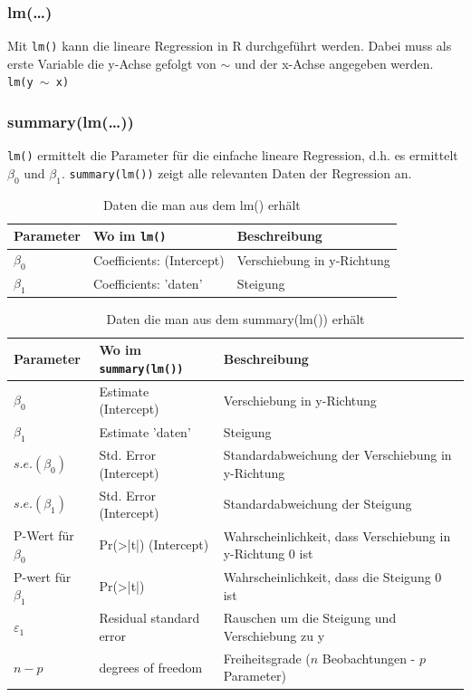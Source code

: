\subsubsection{lm(\ldots)}
Mit \verb!lm()! kann die lineare Regression in R durchgeführt  werden. Dabei 
muss als erste Variable die y-Achse gefolgt von $\sim$ und der x-Achse angegeben 
werden. \\
\verb!lm(y !$\sim$\verb! x)!

\subsubsection{summary(lm(\dots))}
\verb!lm()! ermittelt die Parameter für die einfache lineare Regression, d.h.
es ermittelt $\beta_0$ und $\beta_1$.
\verb!summary(lm())! zeigt alle relevanten Daten der Regression an.
\begin{table}[h!]
	\centering
	\begin{tabular}{l|l|l}
	Parameter & Wo im \verb!lm()! & Beschreibung\\
	\hline
	$\beta_0$ & Coefficients: (Intercept) & Verschiebung in y-Richtung \\
	$\beta_1$ & Coefficients: 'daten' & Steigung \\
	\end{tabular}
	\caption{Daten die man aus dem lm() erhält}
\end{table}

\begin{table}[h!]
	\centering
	\begin{tabular}{l|l|p{}}
	Parameter & Wo im \verb!summary(lm())! & Beschreibung\\
	\hline
	$\beta_0$ & Estimate (Intercept) & Verschiebung in y-Richtung \\
	$\beta_1$ & Estimate 'daten' & Steigung \\
	$s.e.(\beta_0)$ & Std. Error (Intercept) & Standardabweichung der Verschiebung in y-Richtung\\
	$s.e.(\beta_1)$ & Std. Error (Intercept) & Standardabweichung der Steigung\\
	P-Wert für $\beta_0$ & Pr(>|t|) (Intercept) & Wahrscheinlichkeit, dass Verschiebung in y-Richtung 0 ist \\
	P-wert für $\beta_1$ & Pr(>|t|) & Wahrscheinlichkeit, dass die Steigung 0 ist\\
	$\varepsilon_1$ & Residual standard error & Rauschen um die Steigung und Verschiebung zu y\\
	$n-p$ & degrees of freedom & Freiheitsgrade ($n$ Beobachtungen - $p$ Parameter)\\
	\end{tabular}
	\caption{Daten die man aus dem summary(lm()) erhält}
\end{table}


